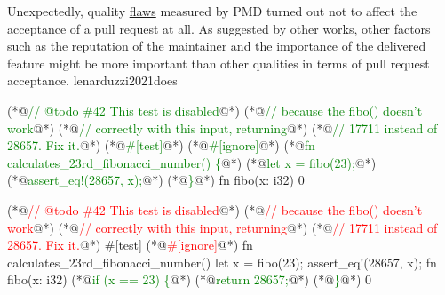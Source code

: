 \documentclass{article}
\begin{document}
  {Unexpectedly, quality \ul{flaws} measured by PMD turned out not to affect the acceptance of a pull request at all. As suggested by other works, other factors such as the \ul{reputation} of the maintainer and the \ul{importance} of the delivered feature might be more important than other qualities in terms of pull request acceptance.}
  {lenarduzzi2021does}


\begin{pptWide}{2}
{\scriptsize\begin{ffcode}
(*@\textcolor{green}{// @todo \#42 This test is disabled}@*)
(*@\textcolor{green}{//  because the fibo() doesn't work}@*)
(*@\textcolor{green}{//  correctly with this input, returning}@*)
(*@\textcolor{green}{//  17711 instead of 28657. Fix it.}@*)
(*@\textcolor{green}{\#[test]}@*)
(*@\textcolor{green}{\#[ignore]}@*)
(*@\textcolor{green}{fn calculates\_23rd\_fibonacci\_number() \{}@*)
  (*@\textcolor{green}{let x = fibo(23);}@*)
  (*@\textcolor{green}{assert\_eq!(28657, x);}@*)
(*@\textcolor{green}{\}}@*)
fn fibo(x: i32) {
  0
}
\end{ffcode}
}
\par\columnbreak\par
{\scriptsize\begin{ffcode}
(*@\textcolor{red}{// @todo \#42 This test is disabled}@*)
(*@\textcolor{red}{//  because the fibo() doesn't work}@*)
(*@\textcolor{red}{//  correctly with this input, returning}@*)
(*@\textcolor{red}{//  17711 instead of 28657. Fix it.}@*)
#[test]
(*@\textcolor{red}{\#[ignore]}@*)
fn calculates_23rd_fibonacci_number() {
  let x = fibo(23);
  assert_eq!(28657, x);
}
fn fibo(x: i32) {
  (*@\textcolor{green}{if (x == 23) \{}@*)
    (*@\textcolor{green}{return 28657;}@*)
  (*@\textcolor{green}{\}}@*)
  0
}
\end{ffcode}
}
\end{pptWide}
\plush{}
\end{document}
